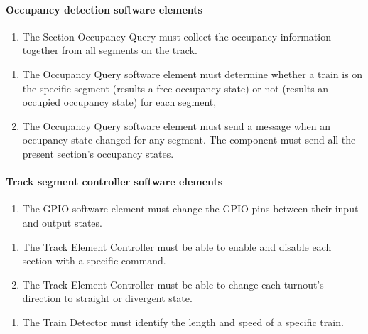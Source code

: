 \paragraph{Occupancy detection software elements}
\begin{enumerate}[label=REQ-SOQ-\arabic*, leftmargin=*, format=\small]
	\item The Section Occupancy Query must collect the occupancy information together from all segments on the track. \label{req:SOQ}
\end{enumerate}

\begin{enumerate}[label=REQ-OCQ-\arabic*, leftmargin=*, format=\small] 
	\item The Occupancy Query software element must determine whether a train is on the specific segment (results a free occupancy state) or not (results an occupied occupancy state) for each segment,  \label{req:OCQ-1}
	\item The Occupancy Query software element must send a message when an occupancy state changed for any segment. The component must send all the present section's occupancy states. \label{req:OCQ-2}
\end{enumerate}

\paragraph{Track segment controller software elements}
\begin{enumerate}[label=REQ-GPIO-\arabic*, leftmargin=*, format=\small] 
	\item The GPIO software element must change the GPIO pins between their input and output states. \label{req:GPIO}
\end{enumerate}

\begin{enumerate}[label=REQ-TEC-\arabic*, leftmargin=*, format=\small]
	\item The Track Element Controller must be able to enable and disable each section with a specific command. \label{req:TEC-1}
	\item The Track Element Controller must be able to change each turnout's direction to straight or divergent state. \label{req:TEC-2}
\end{enumerate}

\begin{enumerate}[label=REQ-TD-\arabic*, leftmargin=*, format=\small]
	\item The Train Detector must identify the length and speed of a specific train. \label{req:TD}
\end{enumerate}

